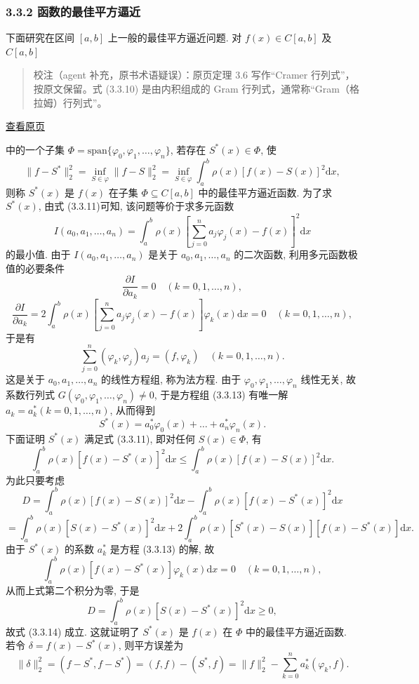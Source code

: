 \documentclass[
  10pt,
  fontset=fandol]{ctexart}
\begin{document}
\subsubsection{3.3.2 函数的最佳平方逼近}\label{ux51fdux6570ux7684ux6700ux4f73ux5e73ux65b9ux903cux8fd1}

下面研究在区间 \([a,b]\) 上一般的最佳平方逼近问题. 对 \(f(x) \in C[a,b]\) 及 \(C[a,b]\)

\begin{quote}
校注（agent 补充，原书术语疑误）：原页定理 3.6 写作``Cramer 行列式''，按原文保留。式 (3.3.10) 是由内积组成的 Gram 行列式，通常称``Gram（格拉姆）行列式''。
\end{quote}

\href{../../source-images/pdf-068.jpeg}{查看原页}

中的一个子集 \(\Phi = \text{span}\{\varphi_0, \varphi_1, \dots, \varphi_n\}\), 若存在 \(S^*(x) \in \Phi\), 使 \[
\| f - S^* \|_2^2 = \inf_{S \in \varphi} \| f - S \|_2^2 = \inf_{S \in \varphi} \int_a^b \rho(x) [f(x) - S(x)]^2 \mathrm{d}x, \tag{3.3.11}
\] 则称 \(S^*(x)\) 是 \(f(x)\) 在子集 \(\Phi \subseteq C[a, b]\) 中的最佳平方逼近函数. 为了求 \(S^*(x)\), 由式 (3.3.11)可知, 该问题等价于求多元函数 \[
I(a_0, a_1, \dots, a_n) = \int_a^b \rho(x) \left[ \sum_{j=0}^n a_j \varphi_j(x) - f(x) \right]^2 \mathrm{d}x \tag{3.3.12}
\] 的最小值. 由于 \(I(a_0, a_1, \dots, a_n)\) 是关于 \(a_0, a_1, \dots, a_n\) 的二次函数, 利用多元函数极值的必要条件 \[
\frac{\partial I}{\partial a_k} = 0 \quad (k = 0, 1, \dots, n),
\] \[
\frac{\partial I}{\partial a_k} = 2 \int_a^b \rho(x) \left[ \sum_{j=0}^n a_j \varphi_j(x) - f(x) \right] \varphi_k(x) \mathrm{d}x = 0 \quad (k = 0, 1, \dots, n),
\] 于是有 \[
\sum_{j=0}^n (\varphi_k, \varphi_j) a_j = (f, \varphi_k) \quad (k = 0, 1, \dots, n). \tag{3.3.13}
\] 这是关于 \(a_0, a_1, \dots, a_n\) 的线性方程组, 称为法方程. 由于 \(\varphi_0, \varphi_1, \dots, \varphi_n\) 线性无关, 故系数行列式 \(G(\varphi_0, \varphi_1, \dots, \varphi_n) \neq 0\), 于是方程组 (3.3.13) 有唯一解 \(a_k = a_k^* (k = 0, 1, \dots, n)\), 从而得到 \[
S^*(x) = a_0^* \varphi_0(x) + \dots + a_n^* \varphi_n(x).
\] 下面证明 \(S^*(x)\) 满足式 (3.3.11), 即对任何 \(S(x) \in \Phi\), 有 \[
\int_a^b \rho(x) [f(x) - S^*(x)]^2 \mathrm{d}x \leqslant \int_a^b \rho(x) [f(x) - S(x)]^2 \mathrm{d}x. \tag{3.3.14}
\] 为此只要考虑 \[
D = \int_a^b \rho(x) [f(x) - S(x)]^2 \mathrm{d}x - \int_a^b \rho(x) [f(x) - S^*(x)]^2 \mathrm{d}x
\] \[
= \int_a^b \rho(x) [S(x) - S^*(x)]^2 \mathrm{d}x + 2 \int_a^b \rho(x) [S^*(x) - S(x)] [f(x) - S^*(x)] \mathrm{d}x.
\] 由于 \(S^*(x)\) 的系数 \(a_k^*\) 是方程 (3.3.13) 的解, 故 \[
\int_a^b \rho(x) [f(x) - S^*(x)] \varphi_k(x) \mathrm{d}x = 0 \quad (k = 0, 1, \dots, n),
\] 从而上式第二个积分为零, 于是 \[
D = \int_a^b \rho(x) [S(x) - S^*(x)]^2 \mathrm{d}x \geqslant 0,
\] 故式 (3.3.14) 成立. 这就证明了 \(S^*(x)\) 是 \(f(x)\) 在 \(\Phi\) 中的最佳平方逼近函数. 若令 \(\delta = f(x) - S^*(x)\), 则平方误差为 \[
\|\delta\|_2^2 = (f - S^*, f - S^*) = (f, f) - (S^*, f) = \|f\|_2^2 - \sum_{k=0}^n a_k^* (\varphi_k, f). \tag{3.3.15}
\]
\end{document}

